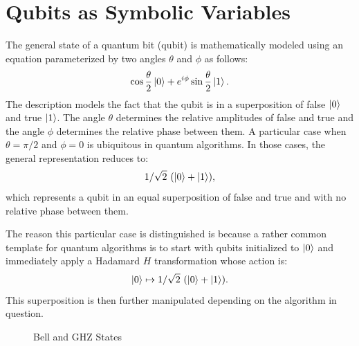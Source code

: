 \documentclass[sigplan,screen]{acmart}
\theoremstyle{definition}
\begin{document}
\section{Qubits as Symbolic Variables}
\label{sec2}

The general state of a quantum bit (qubit) is mathematically modeled
using an equation parameterized by two angles $\theta$ and $\phi$ as
follows:
\[
\cos{\frac{\theta}{2}} \ket{0} + e^{i\phi} \sin{\frac{\theta}{2}} \ket{1} .
\]
The description models the fact that the qubit is in a superposition
of false $\ket{0}$ and true $\ket{1}$. The angle $\theta$
determines the relative amplitudes of false and true and the angle
$\phi$ determines the relative phase between them. A particular case
when $\theta = \pi/2$ and $\phi=0$ is ubiquitous in quantum
algorithms. In those cases, the general representation reduces to:
\[
1/\sqrt{2}~ (\ket{0} + \ket{1} ) ,
\]
which represents a qubit in an equal superposition of false and
true and with no relative phase between them.

The reason this particular case is distinguished is because a rather
common template for quantum algorithms is to start with qubits
initialized to $\ket{0}$ and immediately apply a Hadamard $H$ transformation
whose action is:
\[
  \ket{0} \mapsto 1/\sqrt{2} ~(\ket{0} + \ket{1}) .
\]
This superposition is then further manipulated depending on the
algorithm in question.

\begin{figure}[t]
\begin{center}
\qquad\qquad
{}
\end{center}
\caption{\label{fig:bell2}Bell and GHZ States}
\end{figure}
\end{document}
